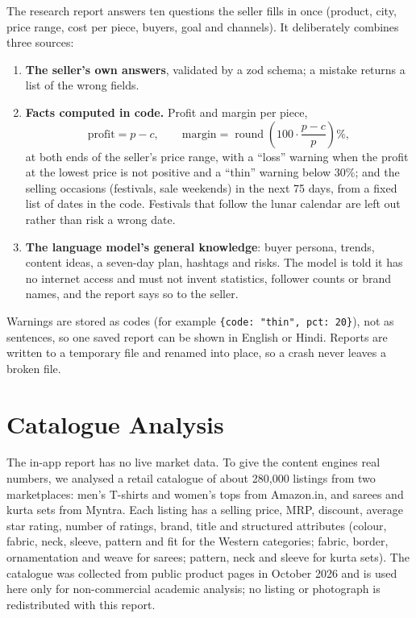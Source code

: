The research report answers ten questions the seller fills in once (product, city, price range, cost per piece, buyers, goal and channels). It deliberately combines three sources:

\begin{enumerate}
\item \textbf{The seller's own answers}, validated by a zod schema; a mistake returns a list of the wrong fields.
\item \textbf{Facts computed in code.} Profit and margin per piece,
\begin{equation}
\text{profit} = p - c, \qquad \text{margin} = \operatorname{round}\!\left(100 \cdot \frac{p - c}{p}\right)\%,
\end{equation}
at both ends of the seller's price range, with a ``loss'' warning when the profit at the lowest price is not positive and a ``thin'' warning below 30\%; and the selling occasions (festivals, sale weekends) in the next 75 days, from a fixed list of dates in the code. Festivals that follow the lunar calendar are left out rather than risk a wrong date.
\item \textbf{The language model's general knowledge}: buyer persona, trends, content ideas, a seven-day plan, hashtags and risks. The model is told it has no internet access and must not invent statistics, follower counts or brand names, and the report says so to the seller.
\end{enumerate}

\noindent Warnings are stored as codes (for example \texttt{\{code: "thin", pct: 20\}}), not as sentences, so one saved report can be shown in English or Hindi. Reports are written to a temporary file and renamed into place, so a crash never leaves a broken file.

\section{Catalogue Analysis}
\label{sec:catalogue}

The in-app report has no live market data. To give the content engines real numbers, we analysed a retail catalogue of \ifMarket\vMkTotalRaw{}\else about 280{,}000\fi{} listings from two marketplaces: men's T-shirts and women's tops from Amazon.in, and sarees and kurta sets from Myntra. Each listing has a selling price, MRP, discount, average star rating, number of ratings, brand, title and structured attributes (colour, fabric, neck, sleeve, pattern and fit for the Western categories; fabric, border, ornamentation and weave for sarees; pattern, neck and sleeve for kurta sets). The catalogue was collected from public product pages in October 2026 and is used here only for non-commercial academic analysis; no listing or photograph is redistributed with this report.

